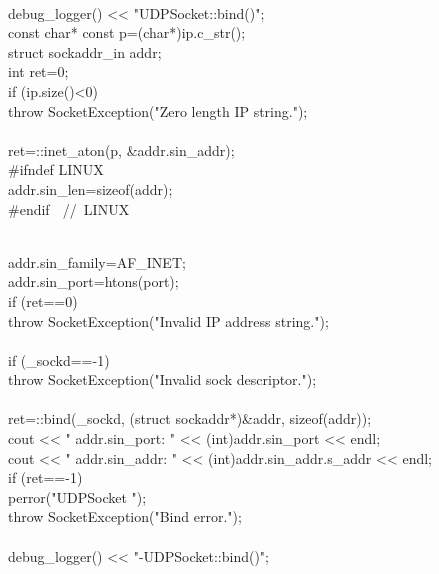 \documentclass{article}
\begin{document}
 {
\\
     debug_logger() << "UDPSocket::bind()\n";
\\
     const char* const p=(char*)ip.c_str();
\\
     struct sockaddr_in addr;
\\
     int ret=0;
\\
     if (ip.size()<0) {
\\
         throw SocketException("Zero length IP string.");
\\
     }      
\\
     ret=::inet_aton(p, &addr.sin_addr);
\\
 #ifndef LINUX
\\
     addr.sin_len=sizeof(addr);
\\
 #endif 
\hbox{// LINUX}\strut\\
     addr.sin_family=AF_INET;
\\
     addr.sin_port=htons(port);
\\
     if (ret==0) {
\\
         throw SocketException("Invalid IP address string.");
\\
     }
\\
     if (_sockd==-1) {
\\
         throw SocketException("Invalid sock descriptor.");
\\
     }
\\
     ret=::bind(_sockd, (struct sockaddr*)&addr, sizeof(addr));
\\
     cout << "    addr.sin_port: " << (int)addr.sin_port << endl;
\\
     cout << "    addr.sin_addr: " << (int)addr.sin_addr.s_addr << endl;
\\
     if (ret==-1) {
\\
         perror("UDPSocket ");
\\
         throw SocketException("Bind error.");
\\
     }
\\
     debug_logger() << "-UDPSocket::bind()\n";
\\
 }
\end{document}
